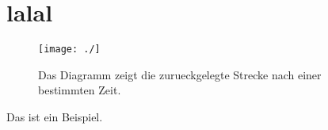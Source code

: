 \documentclass{article}
\begin{document}
\section{lalal}

\begin{figure}[htbp]
    \centering
    \texttt{[image: ./]}
    \caption{Das Diagramm zeigt die zurueckgelegte Strecke nach einer bestimmten Zeit.}
    \label{fig:st-diag}
\end{figure}
Das ist ein Beispiel.
\end{document}
